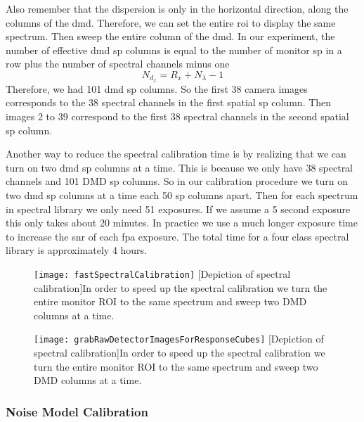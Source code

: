Also remember that the dispersion is only in the horizontal direction, along the columns of the \gls{dmd}. Therefore, we can set the entire \gls{roi} to display the same spectrum. Then sweep the entire column of the \gls{dmd}. In our experiment, the number of effective \gls{dmd} \gls{sp} columns is equal to the number of monitor \gls{sp} in a row plus the number of spectral channels minus one 
%
\begin{equation}
	N_{d_x} = R_x + N_{\lambda} - 1
\end{equation}
%
Therefore, we had 101 \gls{dmd} \gls{sp} columns. So the first 38 camera images corresponds to the 38 spectral channels in the first spatial \gls{sp} column. Then images 2 to 39 correspond to the first 38 spectral channels in the second spatial \gls{sp} column. 

Another way to reduce the spectral calibration time is by realizing that we can turn on two \gls{dmd} \gls{sp} columns at a time. This is because we only have 38 spectral channels and 101 DMD \gls{sp} columns. So in our calibration procedure we turn on two \gls{dmd} \gls{sp} columns at a time each 50 \gls{sp} columns apart. Then for each spectrum in spectral library we only need 51 exposures. If we assume a 5 second exposure this only takes about 20 minutes. In practice we use a much longer exposure time to increase the \gls{snr} of each \gls{fpa} exposure. The total time for a four class spectral library is approximately 4 hours.


\begin{figure}[h]
	\texttt{[image: fastSpectralCalibration]}
	\centering
	[Depiction of spectral calibration]{In order to speed up the spectral calibration we turn the entire monitor ROI to the same spectrum and sweep two DMD columns at a time. }
	\label{fig:fastSpectralCalibration}
\end{figure}

\clearpage
	\begin{figure}[H]
	\texttt{[image: grabRawDetectorImagesForResponseCubes]}
	\centering
	[Depiction of spectral calibration]{In order to speed up the spectral calibration we turn the entire monitor ROI to the same spectrum and sweep two DMD columns at a time.}
	\label{fig:grabRawDetectorImagesForResponseCubes}
\end{figure}


\subsubsection{Noise Model Calibration}

